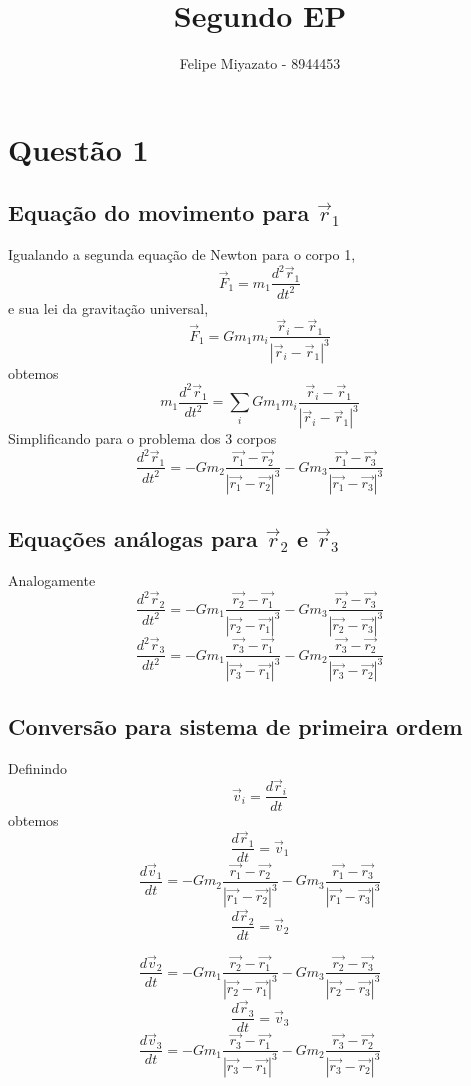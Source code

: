 \documentclass[12pt,runningheads]{article}
\begin{document}

\title{Segundo EP}
\author{Felipe Miyazato - 8944453}
\maketitle

\section{Questão 1}
\subsection{Equação do movimento para \(\vec{r}_1\)}
Igualando a segunda equação de Newton para o corpo 1,
\[\vec{F}_1 = m_1 \frac{d^2\vec{r}_1}{dt^2}\]
e sua lei da gravitação universal,
\[\vec{F}_1 = G m_1 m_i \frac{\vec{r}_i - \vec{r}_1}{|\vec{r}_i - \vec{r}_1|^3}\]
obtemos
\[m_1 \frac{d^2\vec{r}_1}{dt^2} = \sum_i G m_1 m_i \frac{\vec{r}_i - \vec{r}_1}{|\vec{r}_i - \vec{r}_1|^3}\]
Simplificando para o problema dos 3 corpos
\[\frac{d^2\vec{r}_1}{dt^2} = -G m_2 \frac{\vec{r_1} - \vec{r_2}}{|\vec{r_1} - \vec{r_2}|^3} - G m_3 \frac{\vec{r_1} - \vec{r_3}}{|\vec{r_1} - \vec{r_3}|^3}\]
\newpage

\subsection{Equações análogas para \(\vec{r}_2\) e \(\vec{r}_3\)}
Analogamente
\[\frac{d^2\vec{r}_2}{dt^2} = -G m_1 \frac{\vec{r_2} - \vec{r_1}}{|\vec{r_2} - \vec{r_1}|^3} - G m_3 \frac{\vec{r_2} - \vec{r_3}}{|\vec{r_2} - \vec{r_3}|^3}\]
\[\frac{d^2\vec{r}_3}{dt^2} = -G m_1 \frac{\vec{r_3} - \vec{r_1}}{|\vec{r_3} - \vec{r_1}|^3} - G m_2 \frac{\vec{r_3} - \vec{r_2}}{|\vec{r_3} - \vec{r_2}|^3}\]

\subsection{Conversão para sistema de primeira ordem}
Definindo
\[\vec{v}_i = \frac{d\vec{r}_i}{dt}\]
obtemos
\[\frac{d\vec{r}_1}{dt} = \vec{v}_1\]
\[\frac{d\vec{v}_1}{dt} = -G m_2 \frac{\vec{r_1} - \vec{r_2}}{|\vec{r_1} - \vec{r_2}|^3} - G m_3 \frac{\vec{r_1} - \vec{r_3}}{|\vec{r_1} - \vec{r_3}|^3}\]
\[\frac{d\vec{r}_2}{dt} = \vec{v}_2\]

\[\frac{d\vec{v}_2}{dt} = -G m_1 \frac{\vec{r_2} - \vec{r_1}}{|\vec{r_2} - \vec{r_1}|^3} - G m_3 \frac{\vec{r_2} - \vec{r_3}}{|\vec{r_2} - \vec{r_3}|^3}\]
\[\frac{d\vec{r}_3}{dt} = \vec{v}_3\]
\[\frac{d\vec{v}_3}{dt} = -G m_1 \frac{\vec{r_3} - \vec{r_1}}{|\vec{r_3} - \vec{r_1}|^3} - G m_2 \frac{\vec{r_3} - \vec{r_2}}{|\vec{r_3} - \vec{r_2}|^3}\]
\end{document}
